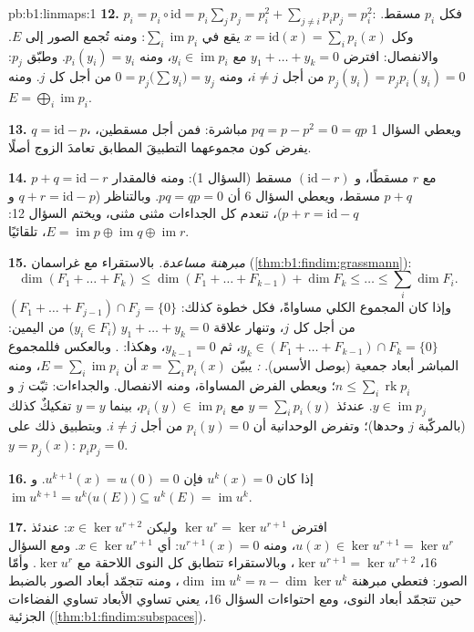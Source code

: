 \begin{solution}{pb:b1:linmaps:1}
\textbf{12.} $p_i = p_i \circ \mathrm{id} = p_i\sum_j p_j =
p_i^2 + \sum_{j \neq i} p_i p_j = p_i^2$: فكل $p_i$
مسقط. وكل $x = \mathrm{id}(x) = \sum_i p_i(x)$ يقع في
$\sum_i \operatorname{im} p_i$: ومنه تُجمع الصور إلى $E$.
والانفصال: افترض $y_1 + \dots + y_k = 0$ مع $y_i \in
\operatorname{im} p_i$، ومنه $p_i(y_i) = y_i$. وطبّق $p_j$: $p_j
(y_i) = p_j p_i (y_i) = 0$ من أجل $i \neq j$، ومنه $0 = p_j\bigl(\sum
y_i\bigr) = y_j$ من أجل كل $j$. ومنه $E = \bigoplus_i
\operatorname{im} p_i$.

\textbf{13.} $q = \mathrm{id} - p$، ويعطي السؤال 1 $pq =
p - p^2 = 0 = qp$ مباشرة: فمن أجل مسقطين، يفرض كون مجموعهما
التطبيقَ المطابق تعامدَ الزوج أصلًا.

\textbf{14.} $p + q = \mathrm{id} - r$ مع $r$ مسقطًا، و
$(\mathrm{id} - r)$ مسقط (السؤال 1): ومنه فالمقدار $p + q$
مسقط، ويعطي السؤال 6 أن $pq = qp = 0$. وبالتناظر ($q +
r = \mathrm{id} - p$ و $p + r = \mathrm{id} - q$)، تنعدم كل
الجداءات مثنى مثنى، ويختم السؤال 12: $E =
\operatorname{im} p \oplus \operatorname{im} q \oplus
\operatorname{im} r$، تلقائيًا.

\textbf{15.} \emph{مبرهنة مساعدة.} بالاستقراء مع غراسمان
(\cref{thm:b1:findim:grassmann}):
\[
\dim(F_1 + \dots + F_k) \leq \dim(F_1 + \dots + F_{k-1}) + \dim
F_k \leq \dots \leq \sum_i \dim F_i .
\]
وإذا كان المجموع الكلي مساواةً، فكل خطوة كذلك: $(F_1 + \dots +
F_{j-1}) \cap F_j = \{0\}$ من أجل كل $j$، وتنهار علاقة $y_1 +
\dots + y_k = 0$ ($y_i \in F_i$) من اليمين: $y_k
\in (F_1 + \dots + F_{k-1}) \cap F_k = \{0\}$، ثم $y_{k-1} =
0$، وهكذا: . وبالعكس فللمجموع المباشر
أبعاد جمعية (بوصل الأسس). \emph{:}
يبيّن $x = \sum_i p_i(x)$ أن $E = \sum_i \operatorname{im} p_i$،
ومنه $n \leq \sum_i \operatorname{rk} p_i$؛ ويعطي الفرض
المساواة، ومنه الانفصال. والجداءات: ثبّت $j$ و $y \in
\operatorname{im} p_j$. عندئذ $y = \sum_i p_i(y)$ مع $p_i(y)
\in \operatorname{im} p_i$، بينما $y = y$ تفكيكٌ
كذلك (بالمركّبة $j$ وحدها)؛ وتفرض الوحدانية أن $p_i(y)
= 0$ من أجل $i \neq j$. وبتطبيق ذلك على $y = p_j(x)$: $p_i p_j = 0$.

\textbf{16.} إذا كان $u^k(x) = 0$ فإن $u^{k+1}(x) = u(0) = 0$. و
$\operatorname{im} u^{k+1} = u^k\bigl(u(E)\bigr) \subseteq
u^k(E) = \operatorname{im} u^k$.

\textbf{17.} افترض $\ker u^{r} = \ker u^{r+1}$ وليكن $x \in
\ker u^{r+2}$: عندئذ $u(x) \in \ker u^{r+1} = \ker u^{r}$، ومنه
$u^{r+1}(x) = 0$: أي $x \in \ker u^{r+1}$. ومع السؤال 16،
$\ker u^{r+1} = \ker u^{r+2}$، وبالاستقراء تتطابق كل
النوى اللاحقة مع $\ker u^{r}$. وأمّا الصور: فتعطي مبرهنة 
$\dim\operatorname{im} u^k = n - \dim\ker u^k$، ومنه تتجمّد أبعاد
الصور بالضبط حين تتجمّد أبعاد النوى،
ومع احتواءات السؤال 16، يعني تساوي الأبعاد
تساوي الفضاءات الجزئية (\cref{thm:b1:findim:subspaces}).


\end{solution}
